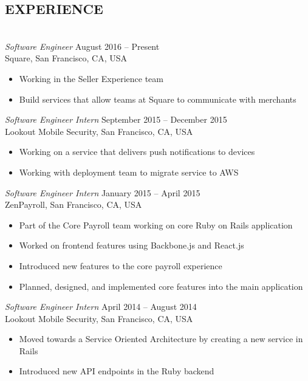 \documentclass[a4paper, letterpaper]{res}
\begin{document}
\begin{resume}
\section{EXPERIENCE} 
				~\\[-2mm]
				{\sl Software Engineer} \hspace*{3.76in}August 2016 -- Present\\
				Square, San Francisco, CA, USA
				\begin{itemize} \itemsep -2pt
				\item Working in the Seller Experience team
				\item Build services that allow teams at Square to communicate with merchants
				\end{itemize}
				{\sl Software Engineer Intern} \hspace*{2.67in}September 2015 -- December 2015 \\
				Lookout Mobile Security, San Francisco, CA, USA
				\begin{itemize} \itemsep -2pt
				\item Working on a service that delivers push notifications to devices
				\item Working with deployment team to migrate service to AWS
				\end{itemize}
				{\sl Software Engineer Intern} \hspace*{3.1in}January 2015 -- April 2015 \\
				ZenPayroll, San Francisco, CA, USA
				\begin{itemize} \itemsep -2pt
				\item Part of the Core Payroll team working on core Ruby on Rails application
				\item Worked on frontend features using Backbone.js and React.js
				\item Introduced new features to the core payroll experience
				\item Planned, designed, and implemented core features into the main application
				\end{itemize}
				{\sl Software Engineer Intern} \hspace*{3.1in}April 2014 -- August 2014 \\
				Lookout Mobile Security, San Francisco, CA, USA
				\begin{itemize} \itemsep -2pt
				\item Moved towards a Service Oriented Architecture by creating a new service in Rails
				\item Introduced new API endpoints in the Ruby backend

\end{itemize}
\end{resume}
\end{document}
